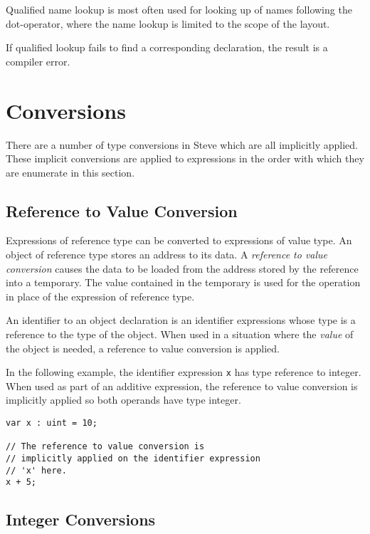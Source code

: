 Qualified name lookup is most often used for looking up of names following the dot-operator, where the name lookup is limited to the scope of the layout.

If qualified lookup fails to find a corresponding declaration, the result is a compiler error.

\section{Conversions} \label{conversions_guide}

There are a number of type conversions in Steve which are all implicitly applied. These implicit conversions are applied to expressions in the order with which they are enumerate in this section.

\subsection{Reference to Value Conversion} \label{reftoval_conv}

Expressions of reference type can be converted to expressions of value type. An object of reference type stores an address to its data. A \textit{reference to value conversion} causes the data to be loaded from the address stored by the reference into a temporary. The value contained in the temporary is used for the operation in place of the expression of reference type.

An identifier to an object declaration is an identifier expressions whose type is a reference to the type of the object. When used in a situation where the \textit{value} of the object is needed, a reference to value conversion is applied. 

In the following example, the identifier expression \texttt{x} has type reference to integer. When used as part of an additive expression, the reference to value conversion is implicitly applied so both operands have type integer.

\noindent\begin{minipage}{\linewidth}
\begin{lstlisting}
var x : uint = 10;

// The reference to value conversion is
// implicitly applied on the identifier expression
// 'x' here.
x + 5;
\end{lstlisting}
\end{minipage}

\subsection{Integer Conversions} \label{int_conv}

